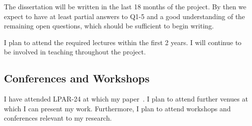 \documentclass{article}
\theoremstyle{definition}
\theoremstyle{definition}
\theoremstyle{definition}
\theoremstyle{definition}
\theoremstyle{definition}
\theoremstyle{definition}
\theoremstyle{definition}
\newcommand{\0}{\mathbf 0}
\newcommand{\1}{\mathbf 1}
\newcounter{question}
\begin{document}
	The dissertation will be written in the last 18 months of the project. By then we expect to have at least partial answers to Q1-5 and a good understanding of the remaining open questions, which should be sufficient to begin writing.

	I plan to attend the required lectures within the first 2 years. I will continue to be involved in teaching throughout the project.

	\subsection{Conferences and Workshops}

	I have attended LPAR-24 at which my paper~\cite{pluska2023embedding}. I plan to attend further venues at which I can present my work. Furthermore, I plan to attend workshops and conferences relevant to my research.

	
	
	
\end{document}
